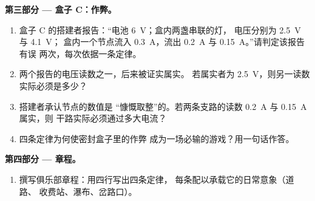 \begin{problem}
\medskip\noindent\textbf{第三部分 --- 盒子 C：作弊。}
\begin{enumerate}[resume]
  \item 盒子 C 的搭建者报告：“电池 \qty{6}{V}；盒内两盏串联的灯，
        电压分别为 \qty{2.5}{V} 与 \qty{4.1}{V}；
        盒内一个节点流入 \qty{0.3}{A}，流出
        \qty{0.2}{A} 与 \qty{0.15}{A}。”请判定该报告有误
        两次，每次依据一条定律。
  \item 两个报告的电压读数之一，后来被证实属实。
        若属实者为 \qty{2.5}{V}，则另一读数
        实际必须是多少？
  \item 搭建者承认节点的数值是
        “慷慨取整”的。若两条支路的读数
        \qty{0.2}{A} 与 \qty{0.15}{A} 属实，则
        干路实际必须通过多大电流？
  \item 四条定律为何使密封盒子里的作弊
        成为一场必输的游戏？用一句话作答。
\end{enumerate}

\medskip\noindent\textbf{第四部分 --- 章程。}
\begin{enumerate}[resume]
  \item 撰写俱乐部章程：用四行写出四条定律，
        每条配以承载它的日常意象（道路、
        收费站、瀑布、岔路口）。
\end{enumerate}
\end{problem}
